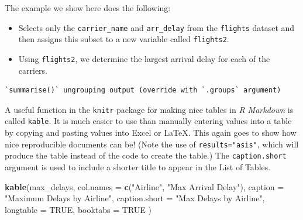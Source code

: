 \documentclass[12pt,twoside]{reedthesis}
\newenvironment{Shaded}{\begin{snugshade}}{\end{snugshade}}
\newcommand{\DataTypeTok}[1]{\textcolor[rgb]{0.13,0.29,0.53}{#1}}
\newcommand{\KeywordTok}[1]{\textcolor[rgb]{0.13,0.29,0.53}{\textbf{#1}}}
\newcommand{\NormalTok}[1]{#1}
\newcommand{\OperatorTok}[1]{\textcolor[rgb]{0.81,0.36,0.00}{\textbf{#1}}}
\newcommand{\OtherTok}[1]{\textcolor[rgb]{0.56,0.35,0.01}{#1}}
\newcommand{\StringTok}[1]{\textcolor[rgb]{0.31,0.60,0.02}{#1}}
\begin{document}
The example we show here does the following:
\begin{itemize}
\item
  Selects only the \texttt{carrier\_name} and \texttt{arr\_delay} from the \texttt{flights} dataset and then assigns this subset to a new variable called \texttt{flights2}.
\item
  Using \texttt{flights2}, we determine the largest arrival delay for each of the carriers.
\end{itemize}
\begin{Shaded}
\end{Shaded}
\begin{verbatim}
`summarise()` ungrouping output (override with `.groups` argument)
\end{verbatim}
A useful function in the \texttt{knitr} package for making nice tables in \emph{R Markdown} is called \texttt{kable}. It is much easier to use than manually entering values into a table by copying and pasting values into Excel or LaTeX. This again goes to show how nice reproducible documents can be! (Note the use of \texttt{results="asis"}, which will produce the table instead of the code to create the table.) The \texttt{caption.short} argument is used to include a shorter title to appear in the List of Tables.
\begin{Shaded}
\begin{Highlighting}[]
\KeywordTok{kable}\NormalTok{(max_delays,}
  \DataTypeTok{col.names =} \KeywordTok{c}\NormalTok{(}\StringTok{"Airline"}\NormalTok{, }\StringTok{"Max Arrival Delay"}\NormalTok{),}
  \DataTypeTok{caption =} \StringTok{"Maximum Delays by Airline"}\NormalTok{,}
  \DataTypeTok{caption.short =} \StringTok{"Max Delays by Airline"}\NormalTok{,}
  \DataTypeTok{longtable =} \OtherTok{TRUE}\NormalTok{,}
  \DataTypeTok{booktabs =} \OtherTok{TRUE}
\NormalTok{)}
\end{Highlighting}
\end{Shaded}
\end{document}
